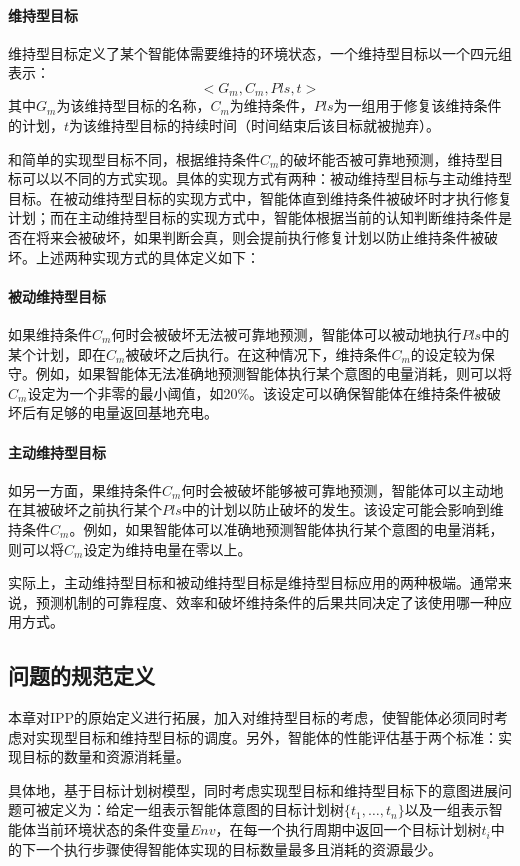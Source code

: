 \paragraph{维持型目标}
维持型目标定义了某个智能体需要维持的环境状态\cite{DBLP:journals/ci/DuffTH14}，一个维持型目标以一个四元组表示：
$$<G_m,C_m,Pls,t>$$
其中$G_m$为该维持型目标的名称，$C_m$为维持条件，$Pls$为一组用于修复该维持条件的计划，$t$为该维持型目标的持续时间（时间结束后该目标就被抛弃）。

和简单的实现型目标不同，根据维持条件$C_m$的破坏能否被可靠地预测，维持型目标可以以不同的方式实现。具体的实现方式有两种：被动维持型目标与主动维持型目标。在被动维持型目标的实现方式中，智能体直到维持条件被破坏时才执行修复计划；而在主动维持型目标的实现方式中，智能体根据当前的认知判断维持条件是否在将来会被破坏，如果判断会真，则会提前执行修复计划以防止维持条件被破坏。上述两种实现方式的具体定义如下：
\paragraph{被动维持型目标}
如果维持条件$C_m$何时会被破坏无法被可靠地预测，智能体可以被动地执行$Pls$中的某个计划，即在$C_m$被破坏之后执行。在这种情况下，维持条件$C_m$的设定较为保守。例如，如果智能体无法准确地预测智能体执行某个意图的电量消耗，则可以将$C_m$设定为一个非零的最小阈值，如20\%。该设定可以确保智能体在维持条件被破坏后有足够的电量返回基地充电。
\paragraph{主动维持型目标}
如另一方面，果维持条件$C_m$何时会被破坏能够被可靠地预测，智能体可以主动地在其被破坏之前执行某个$Pls$中的计划以防止破坏的发生。该设定可能会影响到维持条件$C_m$。例如，如果智能体可以准确地预测智能体执行某个意图的电量消耗，则可以将$C_m$设定为维持电量在零以上。

实际上，主动维持型目标和被动维持型目标是维持型目标应用的两种极端。通常来说，预测机制的可靠程度、效率和破坏维持条件的后果共同决定了该使用哪一种应用方式。

\subsection{问题的规范定义}
本章对IPP的原始定义进行拓展，加入对维持型目标的考虑，使智能体必须同时考虑对实现型目标和维持型目标的调度。另外，智能体的性能评估基于两个标准：实现目标的数量和资源消耗量。

具体地，基于目标计划树模型，同时考虑实现型目标和维持型目标下的意图进展问题可被定义为：给定一组表示智能体意图的目标计划树$\{t_1, \dots, t_n\}$以及一组表示智能体当前环境状态的条件变量$Env$，在每一个执行周期中返回一个目标计划树$t_i$中的下一个执行步骤使得智能体实现的目标数量最多且消耗的资源最少。


